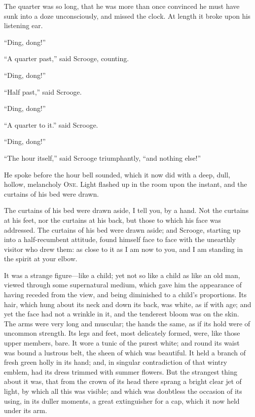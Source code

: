 \documentclass[paper=a5,BCOR=15mm,twoside,DIV=15,headinclude=off,12pt,chapterprefix=off,openany,headings=huge]{scrbook} %
\begin{document}
The quarter was so long, that he was more than once convinced he must have sunk into a doze unconsciously, and missed the clock. At length it broke upon his listening ear.

\enquote{Ding, dong!}

\enquote{A quarter past,} said Scrooge, counting.

\enquote{Ding, dong!}

\enquote{Half past,} said Scrooge.

\enquote{Ding, dong!}

\enquote{A quarter to it.} said Scrooge.

\enquote{Ding, dong!}

\enquote{The hour itself,} said Scrooge triumphantly, \enquote{and nothing else!}

He spoke before the hour bell sounded, which it now did with a deep, dull, hollow, melancholy \textsc{One}. Light flashed up in the room upon the instant, and the curtains of his bed were drawn.

The curtains of his bed were drawn aside, I tell you, by a hand. Not the curtains at his feet, nor the curtains at his back, but those to which his face was addressed. The curtains of his bed were drawn aside; and Scrooge, starting up into a half-recumbent attitude, found himself face to face with the unearthly visitor who drew them: as close to it as I am now to you, and I am standing in the spirit at your elbow.

It was a strange figure—like a child; yet not so like a child as like an old man, viewed through some supernatural medium, which gave him the appearance of having receded from the view, and being diminished to a child's proportions. Its hair, which hung about its neck and down its back, was white, as if with age; and yet the face had not a wrinkle in it, and the tenderest bloom was on the skin. The arms were very long and muscular; the hands the same, as if its hold were of uncommon strength. Its legs and feet, most delicately formed, were, like those upper members, bare. It wore a tunic of the purest white; and round its waist was bound a lustrous belt, the sheen of which was beautiful. It held a branch of fresh green holly in its hand; and, in singular contradiction of that wintry emblem, had its dress trimmed with summer flowers. But the strangest thing about it was, that from the crown of its head there sprang a bright clear jet of light, by which all this was visible; and which was doubtless the occasion of its using, in its duller moments, a great extinguisher for a cap, which it now held under its arm.
\end{document}
